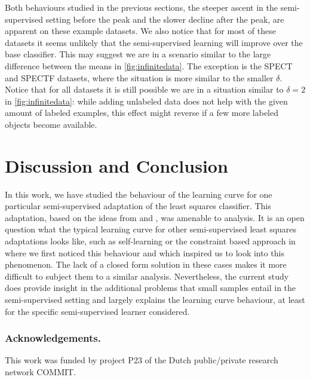 \documentclass[runningheads,a4paper]{llncs}\usepackage[]{graphicx}\usepackage[]{color}
\begin{document}
Both behaviours studied in the previous sections, the steeper ascent in the semi-supervised setting before the peak and the slower decline after the peak, are apparent on these example datasets. We also notice that for most of these datasets it seems unlikely that the semi-supervised learning will improve over the base classifier. This may suggest we are in a scenario similar to the large difference between the means in \cref{fig:infinitedata}. The exception is the SPECT and SPECTF datasets, where the situation is more similar to the smaller $\delta$. Notice that for all datasets it is still possible we are in a situation similar to $\delta=2$ in \cref{fig:infinitedata}: while adding unlabeled data does not help with the given amount of labeled examples, this effect might reverse if a few more labeled objects become available.

\section{Discussion and Conclusion}
In this work, we have studied the behaviour of the learning curve for one particular semi-supervised adaptation of the least squares classifier. This adaptation, based on the ideas from \cite{Shaffer1991} and \cite{Fan2008}, was amenable to analysis. It is an open question what the typical learning curve for other semi-supervised least squares adaptations looks like, such as self-learning or the constraint based approach in \cite{Krijthe2015} where we first noticed this behaviour and which inspired us to look into this phenomenon. The lack of a closed form solution in these cases makes it more difficult to subject them to a similar analysis.  Nevertheless, the current study does provide insight in the additional problems that small samples entail in the semi-supervised setting and largely explains the learning curve behaviour, at least for the specific semi-supervised learner considered.


\subsubsection{Acknowledgements.}
This work was funded by project P23 of the Dutch public/private research network COMMIT.



\end{document}
